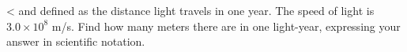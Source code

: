  <%
and defined as the distance light travels in one year.  The
speed of light is $3.0\times10^8$  m/s.  Find how many
meters there are in one light-year, expressing your answer
in scientific notation.

